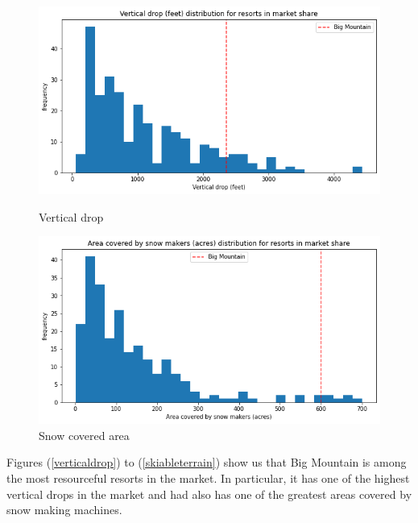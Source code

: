 \documentclass[twocolumn, 12pt]{article}
\begin{document}
\begin{figure}[!htb]
	\begin{minipage}{0.24\textwidth}
		\centering
		\includegraphics[width=\linewidth]{verticaldrop.png}
		\caption{Vertical drop}\label{verticaldrop}
	\end{minipage}\hfill
	\begin {minipage}{0.24\textwidth}
	\centering
	\includegraphics[width=\linewidth]{snowcoveredarea.png}
	\caption{Snow covered area}\label{snowcoveredarea}
\end{minipage}
\end{figure}

Figures (\ref{verticaldrop}) to (\ref{skiableterrain}) show us that Big Mountain is among the most resourceful resorts in the market. In particular, it has one of the highest vertical drops in the market and had also has one of the greatest areas covered by snow making machines. 
\end{document}
